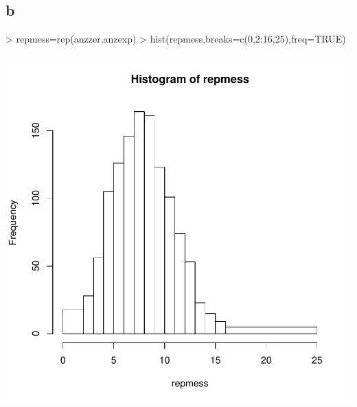 \subsection{b}
\begin{Schunk}
\begin{Sinput}
> repmess=rep(anzzer,anzexp)
> hist(repmess,breaks=c(0,2:16,25),freq=TRUE)
\end{Sinput}
\end{Schunk}
\includegraphics{sw10_1-003}

